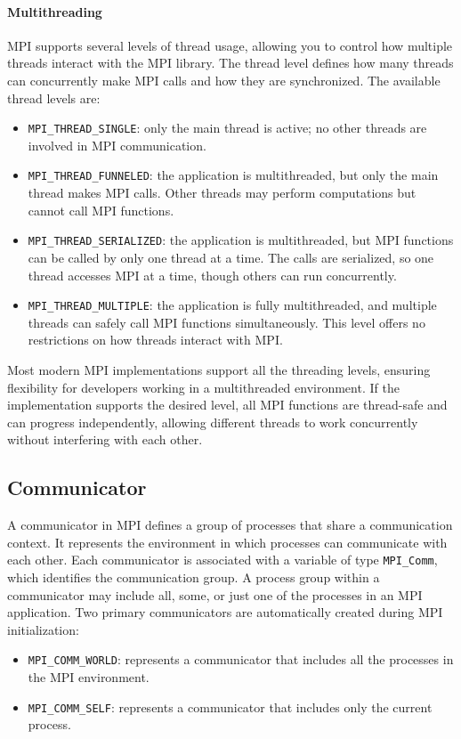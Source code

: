 \paragraph*{Multithreading}
MPI supports several levels of thread usage, allowing you to control how multiple threads interact with the MPI library. 
The thread level defines how many threads can concurrently make MPI calls and how they are synchronized.
The available thread levels are:
\begin{itemize}
    \item \texttt{MPI\_THREAD\_SINGLE}: only the main thread is active; no other threads are involved in MPI communication.
    \item \texttt{MPI\_THREAD\_FUNNELED}: the application is multithreaded, but only the main thread makes MPI calls. 
        Other threads may perform computations but cannot call MPI functions.
    \item \texttt{MPI\_THREAD\_SERIALIZED}: the application is multithreaded, but MPI functions can be called by only one thread at a time. 
        The calls are serialized, so one thread accesses MPI at a time, though others can run concurrently.
    \item \texttt{MPI\_THREAD\_MULTIPLE}: the application is fully multithreaded, and multiple threads can safely call MPI functions simultaneously. 
        This level offers no restrictions on how threads interact with MPI.
\end{itemize}
Most modern MPI implementations support all the threading levels, ensuring flexibility for developers working in a multithreaded environment.
If the implementation supports the desired level, all MPI functions are thread-safe and can progress independently, allowing different threads to work concurrently without interfering with each other.

\subsection{Communicator}
A communicator in MPI defines a group of processes that share a communication context. 
It represents the environment in which processes can communicate with each other. 
Each communicator is associated with a variable of type \texttt{MPI\_Comm}, which identifies the communication group.
A process group within a communicator may include all, some, or just one of the processes in an MPI application.
Two primary communicators are automatically created during MPI initialization: 
\begin{itemize}
    \item \texttt{MPI\_COMM\_WORLD}: represents a communicator that includes all the processes in the MPI environment.
    \item \texttt{MPI\_COMM\_SELF}: represents a communicator that includes only the current process. 
\end{itemize}

